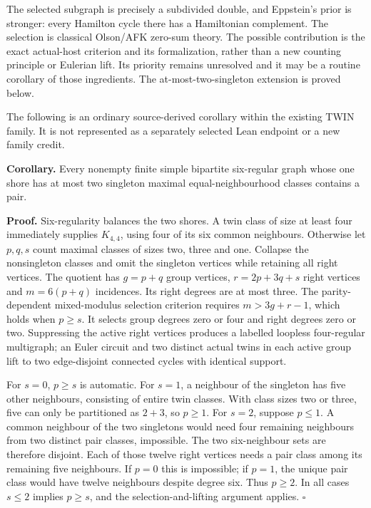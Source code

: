 \documentclass[smallextended]{svjour3}
\newcounter{none} %
\begin{document}
The selected subgraph is precisely a subdivided double, and Eppstein's
prior is stronger: every Hamilton cycle there has a Hamiltonian
complement. The selection is classical Olson/AFK zero-sum theory. The
possible contribution is the exact actual-host criterion and its
formalization, rather than a new counting principle or Eulerian lift.
Its priority remains unresolved and it may be a routine corollary of
those ingredients. The at-most-two-singleton extension is proved below.

The following is an ordinary source-derived corollary within the
existing TWIN family. It is not represented as a separately selected
Lean endpoint or a new family credit.

\textbf{Corollary.} Every nonempty finite simple bipartite six-regular
graph whose one shore has at most two singleton maximal
equal-neighbourhood classes contains a pair.

\textbf{Proof.} Six-regularity balances the two shores. A twin class of
size at least four immediately supplies \(K_{4,4}\), using four of its
six common neighbours. Otherwise let \(p,q,s\) count maximal classes of
sizes two, three and one. Collapse the nonsingleton classes and omit the
singleton vertices while retaining all right vertices. The quotient has
\(g=p+q\) group vertices, \(r=2p+3q+s\) right vertices and \(m=6(p+q)\)
incidences. Its right degrees are at most three. The parity-dependent
mixed-modulus selection criterion requires \(m>3g+r-1\), which holds
when \(p\ge s\). It selects group degrees zero or four and right degrees
zero or two. Suppressing the active right vertices produces a labelled
loopless four-regular multigraph; an Euler circuit and two distinct
actual twins in each active group lift to two edge-disjoint connected
cycles with identical support.

For \(s=0\), \(p\ge s\) is automatic. For \(s=1\), a neighbour of the
singleton has five other neighbours, consisting of entire twin classes.
With class sizes two or three, five can only be partitioned as \(2+3\),
so \(p\ge1\). For \(s=2\), suppose \(p\le1\). A common neighbour of the
two singletons would need four remaining neighbours from two distinct
pair classes, impossible. The two six-neighbour sets are therefore
disjoint. Each of those twelve right vertices needs a pair class among
its remaining five neighbours. If \(p=0\) this is impossible; if
\(p=1\), the unique pair class would have twelve neighbours despite
degree six. Thus \(p\ge2\). In all cases \(s\le2\) implies \(p\ge s\),
and the selection-and-lifting argument applies. \(\square\)
\end{document}
